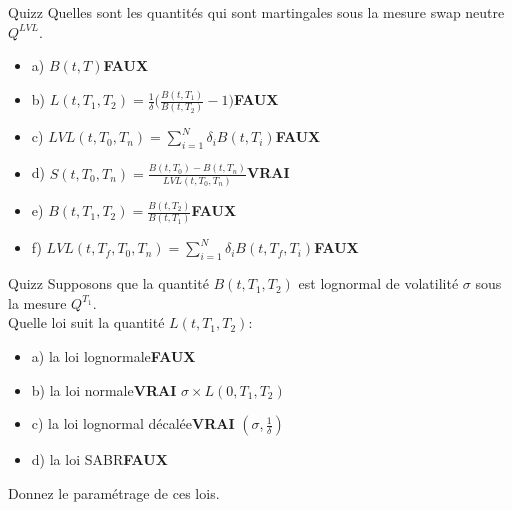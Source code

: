 \documentclass{beamer}
\begin{document}
\begin{frame}{Quizz}
Quelles sont les quantités qui sont martingales sous la mesure swap neutre $Q^{LVL}$.
\begin{itemize}
\item a) $B(t,T)$\textbf{\color{red}FAUX}
\item b) $L(t,T_1,T_2)=\frac{1}{\delta}\big(\frac{B(t,T_1)}{B(t,T_2)}-1 \big)$\textbf{\color{red}FAUX}
\item c) $\displaystyle LVL(t,T_0,T_n)=\sum_{i=1}^{N}\delta_i B(t,T_i)$\textbf{\color{red}FAUX}
\item d) $S(t,T_0,T_n)=\frac{B(t,T_0)-B(t,T_n)}{LVL(t,T_0,T_n)}$\textbf{\color{green}VRAI}
\item e) $B(t,T_1,T_2)=\frac{B(t,T_2)}{B(t,T_1)}$\textbf{\color{red}FAUX} 
\item f) $\displaystyle LVL(t,T_f,T_0,T_n)=\sum_{i=1}^{N}\delta_i B(t,T_f,T_i)$\textbf{\color{red}FAUX}
\end{itemize}
\end{frame}

\begin{frame}{Quizz}
Supposons que la quantité $B(t,T_1,T_2)$ est lognormal de volatilité $\sigma$ sous la mesure $Q^{T_1}$.\\
\vspace{0.5cm}
Quelle loi suit la quantité $L(t,T_1,T_2):$
\begin{itemize}
\item a) la loi lognormale\textbf{\color{red}FAUX}
\item b) la loi normale\textbf{\color{green}VRAI} $\sigma \times L(0,T_1,T_2) $ 
\item c) la loi lognormal décalée\textbf{\color{green}VRAI} $(\sigma,\frac{1}{\delta})$
\item d) la loi SABR\textbf{\color{red}FAUX}
\end{itemize}
\vspace{0.5cm}
Donnez le paramétrage de ces lois.
\end{frame}
\end{document}
